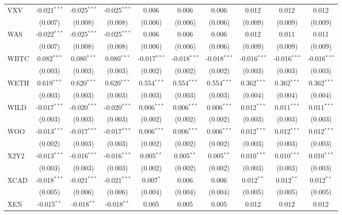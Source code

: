 \begin{table}[!htbp]
\begin{tabular}{@{\extracolsep{5pt}}lccccccccc}
 VXV & -0.021$^{***}$ & -0.025$^{***}$ & -0.025$^{***}$ & 0.006$^{}$ & 0.006$^{}$ & 0.006$^{}$ & 0.012$^{}$ & 0.012$^{}$ & 0.012$^{}$ \\
  & (0.007) & (0.008) & (0.008) & (0.006) & (0.006) & (0.006) & (0.009) & (0.009) & (0.009) \\
 WAS & -0.022$^{***}$ & -0.025$^{***}$ & -0.025$^{***}$ & 0.006$^{}$ & 0.006$^{}$ & 0.006$^{}$ & 0.012$^{}$ & 0.011$^{}$ & 0.011$^{}$ \\
  & (0.007) & (0.008) & (0.008) & (0.006) & (0.006) & (0.006) & (0.009) & (0.009) & (0.009) \\
 WBTC & 0.082$^{***}$ & 0.080$^{***}$ & 0.080$^{***}$ & -0.017$^{***}$ & -0.018$^{***}$ & -0.018$^{***}$ & -0.016$^{***}$ & -0.016$^{***}$ & -0.016$^{***}$ \\
  & (0.003) & (0.003) & (0.003) & (0.002) & (0.002) & (0.002) & (0.003) & (0.003) & (0.003) \\
 WETH & 0.619$^{***}$ & 0.620$^{***}$ & 0.620$^{***}$ & 0.554$^{***}$ & 0.554$^{***}$ & 0.554$^{***}$ & 0.362$^{***}$ & 0.362$^{***}$ & 0.362$^{***}$ \\
  & (0.003) & (0.003) & (0.003) & (0.003) & (0.003) & (0.003) & (0.004) & (0.004) & (0.004) \\
 WILD & -0.017$^{***}$ & -0.020$^{***}$ & -0.020$^{***}$ & 0.006$^{***}$ & 0.006$^{***}$ & 0.006$^{***}$ & 0.012$^{***}$ & 0.011$^{***}$ & 0.011$^{***}$ \\
  & (0.003) & (0.003) & (0.003) & (0.002) & (0.002) & (0.002) & (0.003) & (0.003) & (0.003) \\
 WOO & -0.013$^{***}$ & -0.017$^{***}$ & -0.017$^{***}$ & 0.006$^{***}$ & 0.006$^{***}$ & 0.006$^{***}$ & 0.012$^{***}$ & 0.012$^{***}$ & 0.012$^{***}$ \\
  & (0.002) & (0.003) & (0.003) & (0.002) & (0.002) & (0.002) & (0.003) & (0.003) & (0.003) \\
 X2Y2 & -0.013$^{***}$ & -0.016$^{***}$ & -0.016$^{***}$ & 0.005$^{**}$ & 0.005$^{**}$ & 0.005$^{**}$ & 0.010$^{***}$ & 0.010$^{***}$ & 0.010$^{***}$ \\
  & (0.003) & (0.003) & (0.003) & (0.002) & (0.002) & (0.002) & (0.003) & (0.003) & (0.003) \\
 XCAD & -0.018$^{***}$ & -0.021$^{***}$ & -0.021$^{***}$ & 0.007$^{*}$ & 0.006$^{}$ & 0.006$^{}$ & 0.012$^{**}$ & 0.012$^{**}$ & 0.012$^{**}$ \\
  & (0.005) & (0.006) & (0.006) & (0.004) & (0.004) & (0.004) & (0.005) & (0.005) & (0.005) \\
 XEN & -0.015$^{**}$ & -0.018$^{**}$ & -0.018$^{**}$ & 0.005$^{}$ & 0.005$^{}$ & 0.005$^{}$ & 0.012$^{}$ & 0.012$^{}$ & 0.012$^{}$ \\

\end{tabular}
\end{table}
